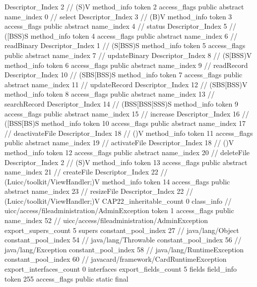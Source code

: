 {{{{{					Descriptor_Index	2		// (S)V
				}
				method_info {
					token	2
					access_flags	public abstract
					name_index	0		// select
					Descriptor_Index	3		// (B)V
				}
				method_info {
					token	3
					access_flags	public abstract
					name_index	4		// status
					Descriptor_Index	5		// ([BSS)S
				}
				method_info {
					token	4
					access_flags	public abstract
					name_index	6		// readBinary
					Descriptor_Index	1		// (S[BSS)S
				}
				method_info {
					token	5
					access_flags	public abstract
					name_index	7		// updateBinary
					Descriptor_Index	8		// (S[BSS)V
				}
				method_info {
					token	6
					access_flags	public abstract
					name_index	9		// readRecord
					Descriptor_Index	10		// (SBS[BSS)S
				}
				method_info {
					token	7
					access_flags	public abstract
					name_index	11		// updateRecord
					Descriptor_Index	12		// (SBS[BSS)V
				}
				method_info {
					token	8
					access_flags	public abstract
					name_index	13		// searchRecord
					Descriptor_Index	14		// (BSS[BSS[SSS)S
				}
				method_info {
					token	9
					access_flags	public abstract
					name_index	15		// increase
					Descriptor_Index	16		// ([BSS[BS)S
				}
				method_info {
					token	10
					access_flags	public abstract
					name_index	17		// deactivateFile
					Descriptor_Index	18		// ()V
				}
				method_info {
					token	11
					access_flags	public abstract
					name_index	19		// activateFile
					Descriptor_Index	18		// ()V
				}
				method_info {
					token	12
					access_flags	public abstract
					name_index	20		// deleteFile
					Descriptor_Index	2		// (S)V
				}
				method_info {
					token	13
					access_flags	public abstract
					name_index	21		// createFile
					Descriptor_Index	22		// (Luicc/toolkit/ViewHandler;)V
				}
				method_info {
					token	14
					access_flags	public abstract
					name_index	23		// resizeFile
					Descriptor_Index	22		// (Luicc/toolkit/ViewHandler;)V
				}
			}
			CAP22_inheritable_count	0
		}
		class_info {		// uicc/access/fileadministration/AdminException
			token	1
			access_flags	public
			name_index	52		// uicc/access/fileadministration/AdminException
			export_supers_count	5
			supers {
				constant_pool_index	27		// java/lang/Object
				constant_pool_index	54		// java/lang/Throwable
				constant_pool_index	56		// java/lang/Exception
				constant_pool_index	58		// java/lang/RuntimeException
				constant_pool_index	60		// javacard/framework/CardRuntimeException
			}
			export_interfaces_count	0
			interfaces {
			}
			export_fields_count	5
			fields {
			field_info {
				token	255
				access_flags	public static final
}}}}}
